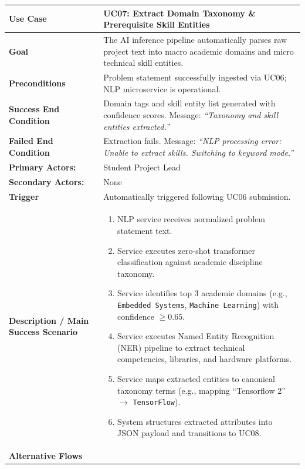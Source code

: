 \begin{table}[H]
\centering
\small
\begin{tabularx}{\textwidth}{|l|X|}
\hline
\rowcolor{lightgray!40} \textbf{Use Case} & \textbf{UC07: Extract Domain Taxonomy \& Prerequisite Skill Entities} \\ \hline
\textbf{Goal} & The AI inference pipeline automatically parses raw project text into macro academic domains and micro technical skill entities. \\ \hline
\textbf{Preconditions} & Problem statement successfully ingested via UC06; NLP microservice is operational. \\ \hline
\textbf{Success End Condition} & Domain tags and skill entity list generated with confidence scores. Message: \textit{``Taxonomy and skill entities extracted.''} \\ \hline
\textbf{Failed End Condition} & Extraction fails. Message: \textit{``NLP processing error: Unable to extract skills. Switching to keyword mode.''} \\ \hline
\textbf{Primary Actors:} & Student Project Lead \\
\textbf{Secondary Actors:} & None \\ \hline
\textbf{Trigger} & Automatically triggered following UC06 submission. \\ \hline
\textbf{Description / Main Success Scenario} &
\begin{enumerate}[leftmargin=*]
    \item NLP service receives normalized problem statement text.
    \item Service executes zero-shot transformer classification against academic discipline taxonomy.
    \item Service identifies top 3 academic domains (e.g., \texttt{Embedded Systems}, \texttt{Machine Learning}) with confidence $\ge 0.65$.
    \item Service executes Named Entity Recognition (NER) pipeline to extract technical competencies, libraries, and hardware platforms.
    \item Service maps extracted entities to canonical taxonomy terms (e.g., mapping ``Tensorflow 2'' $\rightarrow$ \texttt{TensorFlow}).
    \item System structures extracted attributes into JSON payload and transitions to UC08.
\end{enumerate} \\ \hline
\textbf{Alternative Flows} &
\begin{itemize}[leftmargin=*]

\end{itemize}
\end{tabularx}
\end{table}
